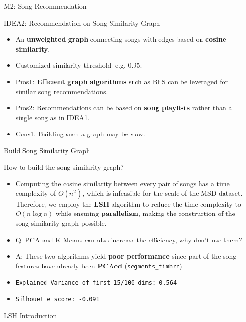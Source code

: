 \documentclass{beamer}
\begin{document}
\begin{section}{M2: Song Recommendation}
\begin{frame}{IDEA2: Recommendation on Song Similarity Graph}
    \begin{itemize}
        \item An \textbf{unweighted graph} connecting songs with edges based on \textbf{cosine similarity}.
        \item Customized similarity threshold, e.g. 0.95.
        \item Pros1: \textbf{Efficient graph algorithms} such as BFS can be leveraged for similar song recommendations.
        \item Pros2: Recommendations can be based on \textbf{song playlists} rather than a single song as in IDEA1.
        \item Cons1: Building such a graph may be slow.
    \end{itemize}
    
    \end{frame}

    \begin{frame}{Build Song Similarity Graph}

    How to build the song similarity graph?

    \begin{itemize}
        \item Computing the cosine similarity between every pair of songs has a time complexity of $O(n^2)$, which is infeasible for the scale of the MSD dataset. Therefore, we employ the \textbf{LSH} algorithm to reduce the time complexity to $O(n \log n)$ while ensuring \textbf{parallelism}, making the construction of the song similarity graph possible.
        \item Q: PCA and K-Means can also increase the efficiency, why don't use them?
        \item A: These two algorithms yield \textbf{poor performance} since part of the song features have already been \textbf{PCAed} (\texttt{segments\_timbre}).
        \item \texttt{Explained Variance of first 15/100 dims: 0.564}
        \item \texttt{Silhouette score: -0.091} 
    \end{itemize}

    \end{frame}

    \begin{frame}[fragile]{LSH Introduction}
    

\end{frame}
\end{section}
\end{document}

